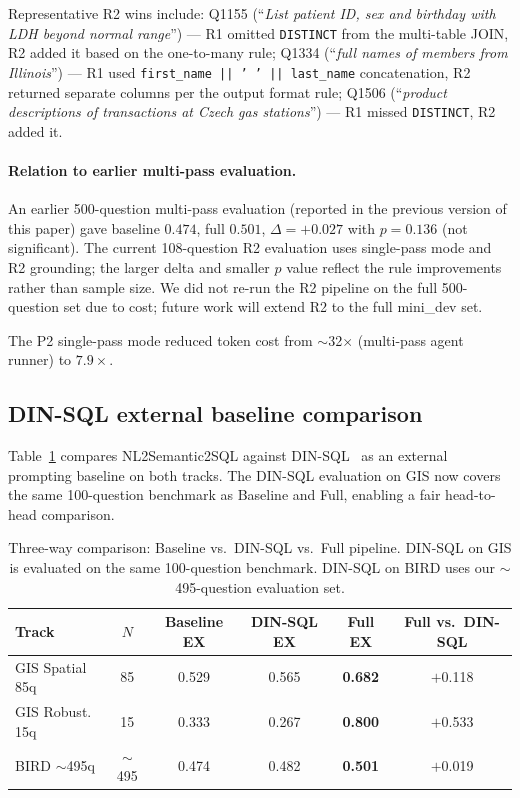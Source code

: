 \documentclass[11pt]{article}
\begin{document}
Representative R2 wins include: Q1155 (``\emph{List patient ID, sex and birthday with LDH beyond normal range}'') --- R1 omitted \texttt{DISTINCT} from the multi-table JOIN, R2 added it based on the one-to-many rule; Q1334 (``\emph{full names of members from Illinois}'') --- R1 used \texttt{first\_name || ' ' || last\_name} concatenation, R2 returned separate columns per the output format rule; Q1506 (``\emph{product descriptions of transactions at Czech gas stations}'') --- R1 missed \texttt{DISTINCT}, R2 added it.

\paragraph{Relation to earlier multi-pass evaluation.} An earlier 500-question multi-pass evaluation (reported in the previous version of this paper) gave baseline $0.474$, full $0.501$, $\Delta=+0.027$ with $p=0.136$ (not significant). The current 108-question R2 evaluation uses single-pass mode and R2 grounding; the larger delta and smaller $p$ value reflect the rule improvements rather than sample size. We did not re-run the R2 pipeline on the full 500-question set due to cost; future work will extend R2 to the full mini\_dev set.

The P2 single-pass mode reduced token cost from $\sim$32$\times$ (multi-pass agent runner) to $7.9\times$.

\subsection{DIN-SQL external baseline comparison}
\label{sec:dinsql}

Table~\ref{tab:dinsql} compares NL2Semantic2SQL against DIN-SQL~\cite{pourreza2023dinsql} as an external prompting baseline on both tracks. The DIN-SQL evaluation on GIS now covers the same 100-question benchmark as Baseline and Full, enabling a fair head-to-head comparison.

\begin{table}[t]
\centering
\caption{Three-way comparison: Baseline vs.\ DIN-SQL vs.\ Full pipeline. DIN-SQL on GIS is evaluated on the same 100-question benchmark. DIN-SQL on BIRD uses our $\sim$495-question evaluation set.}
\label{tab:dinsql}
\begin{tabular}{lccccc}
\toprule
Track & $N$ & Baseline EX & DIN-SQL EX & Full EX & Full vs.\ DIN-SQL \\
\midrule
GIS Spatial 85q  & 85  & 0.529 & 0.565 & \textbf{0.682} & $+$0.118 \\
GIS Robust. 15q  & 15  & 0.333 & 0.267 & \textbf{0.800} & $+$0.533 \\
BIRD $\sim$495q  & $\sim$495 & 0.474 & 0.482 & \textbf{0.501} & $+$0.019 \\
\bottomrule
\end{tabular}
\end{table}
\end{document}
